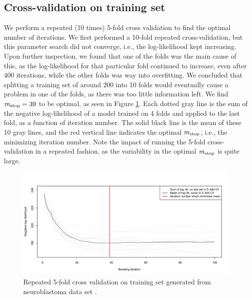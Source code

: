 \subsection{Cross-validation on training set}
We perform a repeated (10 times) 5-fold cross validation to find the optimal number of iterations.
We first performed a 10-fold repeated cross-validation, but this parameter search did not converge, i.e., the log-likelihood kept increasing.
Upon further inspection, we found that one of the folds was the main cause of this, as the log-likelihood for that particular fold continued to increase, even after 400 iterations, while the other folds was way into overfitting.
We concluded that splitting a training set of around 200 into 10 folds would eventually cause a problem in one of the folds, as there was too little information left.
We find $m_{\text{stop}}=39$ to be optimal, as seen in Figure \ref{fig:neuroblastoma-cv}.
Each dotted gray line is the sum of the negative log-likelihood of a model trained on 4 folds and applied to the last fold, as a function of iteration number.
The solid black line is the mean of these 10 gray lines, and the red vertical line indicates the optimal $m_{\text{stop}}$, i.e., the minimizing iteration number.
Note the impact of running the 5-fold cross-validation in a repeated fashion, as the variability in the optimal $m_{\text{stop}}$ is quite large.

\begin{figure}\label{fig:neuroblastoma-cv}
\caption{Repeated 5-fold cross validation on training set generated from neuroblastoma data set \citep{oberthuer-data}.}
\centering\includegraphics[scale=0.4]{figures/oberthuer_CVK5_01.pdf}
\end{figure}

